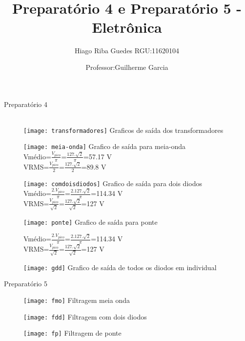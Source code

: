 \documentclass[11pt,a4paper]{article}
\title{Preparatório 4 e Preparatório 5 - Eletrônica}
\author{Hiago Riba Guedes RGU:11620104}
\date{Professor:Guilherme Garcia}
\begin{document}
\maketitle
Preparatório 4\\\\
\begin{figure}[!htb]
\texttt{[image: transformadores]}
Graficos de saída dos transformadores
\end{figure}

\begin{figure}[!htb]
\texttt{[image: meia-onda]}
Grafico de saída para meia-onda\\
Vmédio=$\frac{V_{pico}}{\pi}$=$\frac{127.\sqrt{2}}{\pi}$=57.17 V\\
VRMS=$\frac{V_{pico}}{2}$=$\frac{127.\sqrt{2}}{2}$=89.8 V
\end{figure} 

\begin{figure}[!htb]
\texttt{[image: comdoisdiodos]}
Grafico de saída para dois diodos
Vmédio=$\frac{2.V_{pico}}{\pi}$=$\frac{2.127.\sqrt{2}}{\pi}$=114.34 V\\
VRMS=$\frac{V_{pico}}{\sqrt{2}}$=$\frac{127.\sqrt{2}}{\sqrt{2}}$=127 V

\end{figure}

\begin{figure}[!htb]
\texttt{[image: ponte]}
Grafico de saída para ponte

Vmédio=$\frac{2.V_{pico}}{\pi}$=$\frac{2.127.\sqrt{2}}{\pi}$=114.34 V\\
VRMS=$\frac{V_{pico}}{\sqrt{2}}$=$\frac{127.\sqrt{2}}{\sqrt{2}}$=127 V
\end{figure}

\begin{figure}[!htb]
\texttt{[image: gdd]}
Grafico de saída de todos os diodos em individual
\end{figure}

Preparatório 5

\begin{figure}[!htb]
\texttt{[image: fmo]}
Filtragem meia onda
\end{figure}

\begin{figure}[!htb]
\texttt{[image: fdd]}
Filtragem com dois diodos
\end{figure}

\begin{figure}[!htb]
\texttt{[image: fp]}
Filtragem de ponte
\end{figure}
\end{document}
